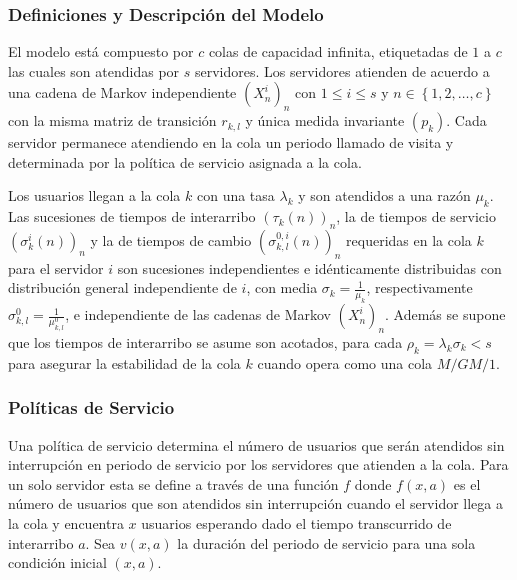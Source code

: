 \subsubsection{Definiciones y Descripci\'on del Modelo}
El modelo est\'a compuesto por $c$ colas de capacidad infinita,
etiquetadas de $1$ a $c$ las cuales son atendidas por $s$
servidores. Los servidores atienden de acuerdo a una cadena de
Markov independiente $\left(X^{i}_{n}\right)_{n}$ con $1\leq i\leq
s$ y $n\in\left\{1,2,\ldots,c\right\}$ con la misma matriz de
transici\'on $r_{k,l}$ y \'unica medida invariante
$\left(p_{k}\right)$. Cada servidor permanece atendiendo en la
cola un periodo llamado de visita y determinada por la pol\'itica de
servicio asignada a la cola.

Los usuarios llegan a la cola $k$ con una tasa $\lambda_{k}$ y son
atendidos a una raz\'on $\mu_{k}$. Las sucesiones de tiempos de
interarribo $\left(\tau_{k}\left(n\right)\right)_{n}$, la de
tiempos de servicio
$\left(\sigma_{k}^{i}\left(n\right)\right)_{n}$ y la de tiempos de
cambio $\left(\sigma_{k,l}^{0,i}\left(n\right)\right)_{n}$
requeridas en la cola $k$ para el servidor $i$ son sucesiones
independientes e id\'enticamente distribuidas con distribuci\'on
general independiente de $i$, con media
$\sigma_{k}=\frac{1}{\mu_{k}}$, respectivamente
$\sigma_{k,l}^{0}=\frac{1}{\mu_{k,l}^{0}}$, e independiente de las
cadenas de Markov $\left(X^{i}_{n}\right)_{n}$. Adem\'as se supone
que los tiempos de interarribo se asume son acotados, para cada
$\rho_{k}=\lambda_{k}\sigma_{k}<s$ para asegurar la estabilidad de
la cola $k$ cuando opera como una cola $M/GM/1$.
\subsubsection{Pol\'iticas de Servicio}
Una pol\'itica de servicio determina el n\'umero de usuarios que ser\'an
atendidos sin interrupci\'on en periodo de servicio por los
servidores que atienden a la cola. Para un solo servidor esta se
define a trav\'es de una funci\'on $f$ donde $f\left(x,a\right)$ es el
n\'umero de usuarios que son atendidos sin interrupci\'on cuando el
servidor llega a la cola y encuentra $x$ usuarios esperando dado
el tiempo transcurrido de interarribo $a$. Sea $v\left(x,a\right)$
la duraci\'on del periodo de servicio para una sola condici\'on
inicial $\left(x,a\right)$.

